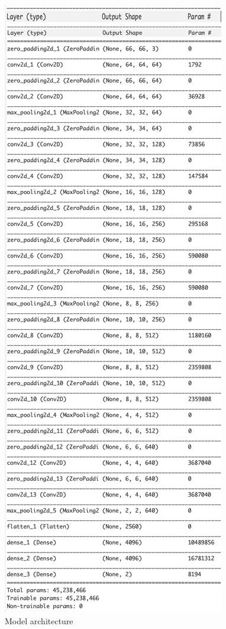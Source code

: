 \documentclass[a4paper]{article}
\begin{document}
\begin{figure}[h!]
\centering
\includegraphics[scale=0.3]{VGG_arch.png}
\caption{Model architecture}
\label{fig:vgg}
\end{figure}
\end{document}

